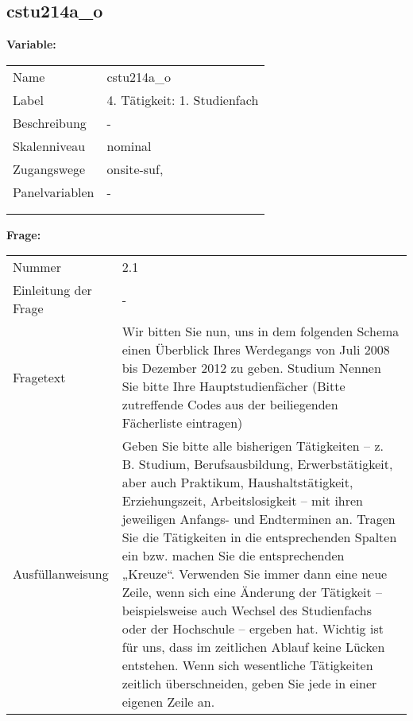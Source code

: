 	
	
	\subsection{cstu214a\_o}
	\label{subSection:cstu214a_o}

	\noindent\textbf{Variable:}\\
		\begin{tabular}{lL{11.3cm}}
			\label{tableVariable:cstu214a_o}
			Name & cstu214a\_o \\
			Label & 4. Tätigkeit: 1. Studienfach \\
			Beschreibung & - \\
			Skalenniveau & nominal \\
			Zugangswege &
				onsite-suf,
 \\
			Panelvariablen & -
			 \\
			 \\
 \\
		\end{tabular}

		\vspace*{1 cm}
		\noindent\textbf{Frage:}\\
		\begin{tabular}{lL{11.3cm}}
			\label{tableQuestion:cstu214a_o}
			Nummer & 2.1 \\
			Einleitung der Frage & - \\
			Fragetext & Wir bitten Sie nun, uns in dem folgenden Schema einen Überblick Ihres Werdegangs von Juli 2008 bis Dezember 2012 zu geben.
Studium
Nennen Sie bitte Ihre Hauptstudienfächer
(Bitte zutreffende Codes aus der beiliegenden Fächerliste eintragen) \\
			Ausfüllanweisung & Geben Sie bitte alle bisherigen Tätigkeiten – z. B. Studium, Berufsausbildung, Erwerbstätigkeit, aber auch Praktikum, Haushaltstätigkeit,
Erziehungszeit, Arbeitslosigkeit – mit ihren jeweiligen Anfangs- und Endterminen an. Tragen Sie die Tätigkeiten in die entsprechenden Spalten ein bzw. machen Sie die entsprechenden „Kreuze“. Verwenden Sie immer dann eine neue Zeile, wenn sich eine Änderung der Tätigkeit – beispielsweise auch Wechsel des Studienfachs oder der Hochschule – ergeben hat. Wichtig ist für uns, dass im zeitlichen Ablauf keine Lücken entstehen. Wenn sich wesentliche Tätigkeiten zeitlich überschneiden, geben Sie jede in einer eigenen Zeile an. \\
		\end{tabular}





